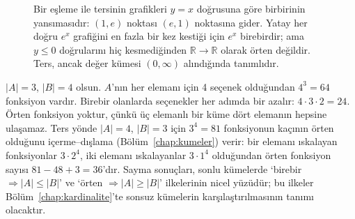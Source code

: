 \begin{figure}[htbp]
\centering
{}
\caption{Bir eşleme ile tersinin grafikleri $y=x$ doğrusuna göre birbirinin yansımasıdır: $(1,e)$ noktası $(e,1)$ noktasına gider. Yatay her doğru $e^x$ grafiğini en fazla bir kez kestiği için $e^x$ birebirdir; ama $y\le0$ doğrularını hiç kesmediğinden $\mathbb R\to\mathbb R$ olarak örten değildir. Ters, ancak değer kümesi $(0,\infty)$ alındığında tanımlıdır.}
\end{figure}

\begin{ornek}
$|A|=3$, $|B|=4$ olsun. $A$’nın her elemanı için 4 seçenek olduğundan $4^3=64$ fonksiyon vardır. Birebir olanlarda seçenekler her adımda bir azalır: $4\cdot3\cdot2=24$. Örten fonksiyon yoktur, çünkü üç elemanlı bir küme dört elemanın hepsine ulaşamaz. Ters yönde $|A|=4$, $|B|=3$ için $3^4=81$ fonksiyonun kaçının örten olduğunu içerme–dışlama (Bölüm~\ref{chap:kumeler}) verir: bir elemanı ıskalayan fonksiyonlar $3\cdot2^4$, iki elemanı ıskalayanlar $3\cdot1^4$ olduğundan örten fonksiyon sayısı $81-48+3=36$’dır. Sayma sonuçları, sonlu kümelerde ‘birebir $\Rightarrow |A|\le|B|$’ ve ‘örten $\Rightarrow |A|\ge|B|$’ ilkelerinin nicel yüzüdür; bu ilkeler Bölüm~\ref{chap:kardinalite}’te sonsuz kümelerin karşılaştırılmasının tanımı olacaktır.
\end{ornek}

